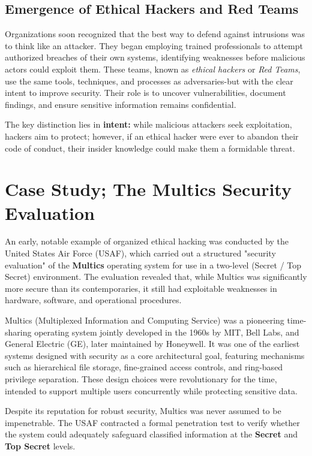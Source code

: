\subsection{Emergence of Ethical Hackers and Red Teams}
Organizations soon recognized that the best way to defend against intrusions was to think like an attacker. They began employing trained professionals to attempt authorized breaches of their own systems, identifying weaknesses before malicious actors could exploit them. These teams, known as \textit{ethical hackers} or \textit{Red Teams}, use the same tools, techniques, and processes as adversaries-but with the clear intent to improve security. Their role is to uncover vulnerabilities, document findings, and ensure sensitive information remains confidential.

The key distinction lies in \textbf{intent:} while malicious attackers seek exploitation, hackers aim to protect; however, if an ethical hacker were ever to abandon their code of conduct, their insider knowledge could make them a formidable threat.

\section{Case Study; The Multics Security Evaluation}
An early, notable example of organized ethical hacking was conducted by the United States Air Force (USAF), which carried out a structured "security evaluation" of the \textbf{Multics} operating system for use in a two-level (Secret / Top Secret) environment. The evaluation revealed that, while Multics was significantly more secure than its contemporaries, it still had exploitable weaknesses in hardware, software, and operational procedures.

Multics (Multiplexed Information and Computing Service) was a pioneering time-sharing operating system jointly developed in the 1960s by MIT, Bell Labs, and General Electric (GE), later maintained by Honeywell. It was one of the earliest systems designed with security as a core architectural goal, featuring mechanisms such as hierarchical file storage, fine-grained access controls, and ring-based privilege separation. These design choices were revolutionary for the time, intended to support multiple users concurrently while protecting sensitive data. 

Despite its reputation for robust security, Multics was never assumed to be impenetrable. The USAF contracted a formal penetration test to verify whether the system could adequately safeguard classified information at the \textbf{Secret} and \textbf{Top Secret} levels.

